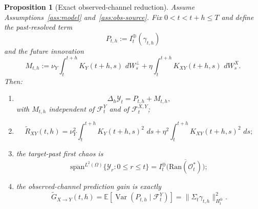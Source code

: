 \documentclass[11pt,a4paper]{amsart}
\theoremstyle{plain}
\newtheorem{proposition}[theorem]{Proposition}
\theoremstyle{definition}
\theoremstyle{remark}
\DeclareMathOperator{\Var}{Var}
\newcommand{\EE}{\mathbb{E}}
\newcommand{\dd}{\,d}
\begin{document}
\begin{proposition}[Exact observed-channel reduction]
\label{prop:observed-reduction}
Assume Assumptions~\ref{ass:model} and~\ref{ass:obs-source}. Fix $0<t<t+h\le T$ and
define the past-resolved term
\begin{equation}\label{eq:past-term}
P_{t,h}:=I_t^\oplus(\gamma_{t,h})
\end{equation}
and the future innovation
\begin{equation}\label{eq:future-term}
M_{t,h}
:=
\nu_Y\int_t^{t+h}K_Y(t+h,s)\,\dd W_s^\perp
+ \eta\int_t^{t+h}K_{XY}(t+h,s)\,\dd W_s^X.
\end{equation}
Then:
\begin{enumerate}[label=(\roman*)]
\item
\begin{equation}\label{eq:decomp}
\Delta_h\mathcal Y_t=P_{t,h}+M_{t,h},
\end{equation}
with $M_{t,h}$ independent of $\mathcal F_t^Y$ and of $\mathcal F_t^{X,Y}$;
\item
\begin{equation}\label{eq:RtildeXY-exact}
\widetilde R_{XY}(t,h)
=
\nu_Y^2 \int_t^{t+h} K_Y(t+h,s)^2\,\dd s
+ \eta^2 \int_t^{t+h} K_{XY}(t+h,s)^2\,\dd s;
\end{equation}
\item the target-past first chaos is
\begin{equation}\label{eq:first-chaos-Y}
\overline{\mathrm{span}}^{L^2(\Omega)}\{\mathcal Y_r:0\le r\le t\}
=
I_t^\oplus\bigl(\overline{\mathrm{Ran}(\mathcal O_t^*)}\bigr);
\end{equation}
\item the observed-channel prediction gain is exactly
\begin{equation}\label{eq:Gtilde-exact}
\widetilde G_{X\to Y}(t,h)
=
\EE\!\left[\Var(P_{t,h}\mid \mathcal F_t^Y)\right]
=
\|\Sigma_t \gamma_{t,h}\|_{H_t^\oplus}^2.
\end{equation}
\end{enumerate}
\end{proposition}
\end{document}
